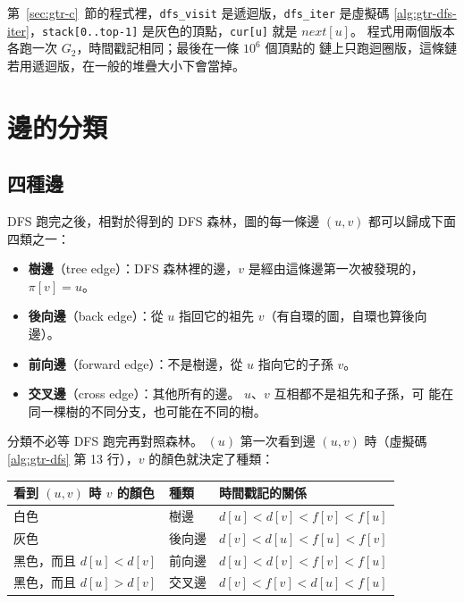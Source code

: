 第~\ref{sec:gtr-c}~節的程式裡，\texttt{dfs\_visit} 是遞迴版，\texttt{dfs\_iter} 是虛擬碼
\ref{alg:gtr-dfs-iter}，\texttt{stack[0..top-1]} 是灰色的頂點，\texttt{cur[u]} 就是
$\mathit{next}[u]$。 程式用兩個版本各跑一次 $G_2$，時間戳記相同；最後在一條 $10^6$ 個頂點的
鏈上只跑迴圈版，這條鏈若用遞迴版，在一般的堆疊大小下會當掉。

\section{邊的分類}
\label{sec:gtr-class}

\subsection{四種邊}

DFS 跑完之後，相對於得到的 DFS 森林，圖的每一條邊 $(u, v)$ 都可以歸成下面四類之一：

\begin{itemize}
\item \textbf{樹邊}（tree edge）：DFS 森林裡的邊，$v$ 是經由這條邊第一次被發現的，
$\pi[v] = u$。
\item \textbf{後向邊}（back edge）：從 $u$ 指回它的祖先 $v$（有自環的圖，自環也算後向
邊）。
\item \textbf{前向邊}（forward edge）：不是樹邊，從 $u$ 指向它的子孫 $v$。
\item \textbf{交叉邊}（cross edge）：其他所有的邊。 $u$、$v$ 互相都不是祖先和子孫，可
能在同一棵樹的不同分支，也可能在不同的樹。
\end{itemize}

分類不必等 DFS 跑完再對照森林。 $(u)$ 第一次看到邊 $(u, v)$ 時（虛擬碼
\ref{alg:gtr-dfs} 第 13 行），$v$ 的顏色就決定了種類：

\begin{center}
\begin{tabular}{lll}
\toprule
看到 $(u, v)$ 時 $v$ 的顏色 & 種類 & 時間戳記的關係 \\
\midrule
白色 & 樹邊 & $d[u] < d[v] < f[v] < f[u]$ \\
灰色 & 後向邊 & $d[v] < d[u] < f[u] < f[v]$ \\
黑色，而且 $d[u] < d[v]$ & 前向邊 & $d[u] < d[v] < f[v] < f[u]$ \\
黑色，而且 $d[u] > d[v]$ & 交叉邊 & $d[v] < f[v] < d[u] < f[u]$ \\
\bottomrule
\end{tabular}
\end{center}


